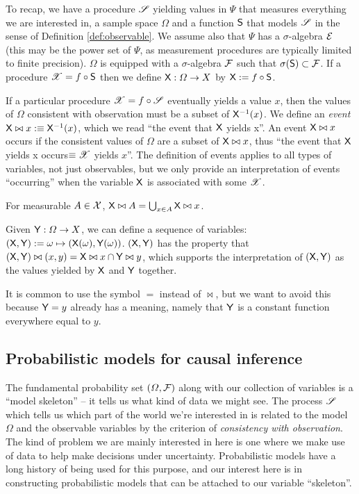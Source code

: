 To recap, we have a procedure $\mathscr{S}$ yielding values in $\Psi$ that measures everything we are interested in, a sample space $\Omega$ and a function $\mathsf{S}$ that models $\mathscr{S}$ in the sense of Definition \ref{def:observable}. We assume also that $\Psi$ has a $\sigma$-algebra $\mathcal{E}$ (this may be the power set of $\Psi$, as measurement procedures are typically limited to finite precision). $\Omega$ is equipped with a $\sigma$-algebra $\mathcal{F}$ such that $\sigma(\mathsf{S})\subset \mathcal{F}$. If a procedure $\mathscr{X}=f\circ \mathsf{S}$ then we define $\mathsf{X}:\Omega\to X$ by $\mathsf{X}:=f\circ\mathsf{S}$.

If a particular procedure $\mathscr{X}=f\circ \mathscr{S}$ eventually yields a value $x$, then the values of $\Omega$ consistent with observation must be a subset of $\mathsf{X}^{-1}(x)$. We define an \emph{event} $\mathsf{X}\bowtie x:\equiv \mathsf{X}^{-1}(x)$, which we read ``the event that $\mathsf{X}$ yields x''. An event $\mathsf{X}\bowtie x$ occurs if the consistent values of $\Omega$ are a subset of $\mathsf{X}\bowtie x$, thus ``the event that $\mathsf{X}$ yields x occurs$\equiv \mathscr{X}$ yields $x$''. The definition of events applies to all types of variables, not just observables, but we only provide an interpretation of events ``occurring'' when the variable $\mathsf{X}$ is associated with some $\mathscr{X}$.

For measurable $A\in \mathcal{X}$, $\mathsf{X}\bowtie A=\bigcup_{x\in A} \mathsf{X}\bowtie x$. 

Given $\mathsf{Y}:\Omega\to X$, we can define a sequence of variables: $(\mathsf{X},\mathsf{Y}):=\omega\mapsto (\mathsf{X}(\omega),\mathsf{Y}(\omega))$. $(\mathsf{X},\mathsf{Y})$ has the property that $(\mathsf{X},\mathsf{Y})\bowtie (x,y)= \mathsf{X}\bowtie x\cap \mathsf{Y}\bowtie y$, which supports the interpretation of $(\mathsf{X},\mathsf{Y})$ as the values yielded by $\mathsf{X}$ and $\mathsf{Y}$ together.

It is common to use the symbol $=$ instead of $\bowtie$, but we want to avoid this because $\mathsf{Y}=y$ already has a meaning, namely that $\mathsf{Y}$ is a constant function everywhere equal to $y$. 

\subsection{Probabilistic models for causal inference}

The fundamental probability set $(\Omega,\mathcal{F})$ along with our collection of variables is a ``model skeleton'' -- it tells us what kind of data we might see. The process $\mathscr{S}$ which tells us which part of the world we're interested in is related to the model $\Omega$ and the observable variables by the criterion of \emph{consistency with observation}. The kind of problem we are mainly interested in here is one where we make use of data to help make decisions under uncertainty. Probabilistic models have a long history of being used for this purpose, and our interest here is in constructing probabilistic models that can be attached to our variable ``skeleton''. 

